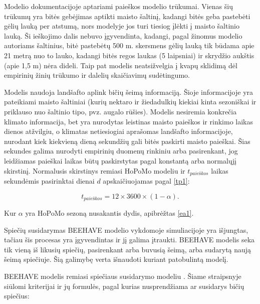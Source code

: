 \documentclass{VUMIFPSmagistrinis}
\begin{document}
Modelio dokumentacijoje aptariami paieškos modelio trūkumai. Vienas šių trūkumų yra bitės gebėjimas aptikti maisto šaltinį, kadangi bitės geba pastebėti gėlių lauką per atstumą, nors modelyje jos turi tiesiog įlėkti į maisto šaltinio lauką. Ši ieškojimo dalis nebuvo įgyvendinta, kadangi, pagal žinomus modelio autoriams šaltinius, bitė pastebėtų 500 m. skersmens gėlių lauką tik būdama apie 21 metrą nuo to lauko, kadangi bitės regos laukas (5 laipsniai) ir skrydžio aukštis (apie 1,5 m) nėra dideli. Taip pat modelis neatsižvelgia į kvapų sklidimą dėl empirinių žinių trūkumo ir dalelių skaičiavimų sudėtingumo.






Modelis naudoja landšafto aplink bičių šeimą informaciją. Šioje informacijoje yra pateikiami maisto šaltiniai (kurių nektaro ir žiedadulkių kiekiai kinta sezoniškai ir priklauso nuo šaltinio tipo, pvz. augalo rūšies).
Modelis nesiremia konkrečia klimato informacija, bet yra nurodytas leistinas maisto paieškos ir rinkimo laikas dienos atžvilgiu, o klimatas netiesiogiai aprašomas landšafto informacijoje, nurodant kiek kiekvieną dieną sekundžių gali bitės paskirti maisto paieškai. Šias sekundes galima nurodyti empirinių duomenų rinkiniu arba pasirenkant, jog leidžiamas paieškai laikas būtų paskirstytas pagal konstantą arba normalųjį skirstinį. Normalusis skirstinys remiasi HoPoMo modeliu ir $t_{paie\textit{\v{s}}kos}$ laikas sekundėmis pasirinktai dienai $d$ apskaičiuojamas pagal \eqref{tp1}:
\newpage

\begin{equation}\label{tp1}
t_{paie\textit{\v{s}}kos}= 12×3600×(1-\alpha).
\end{equation}

Kur $\alpha$ yra HoPoMo sezoną nusakantis dydis, apibrėžtas \eqref{ea1}.



Spiečių susidarymas BEEHAVE modelio vykdomoje simuliacijoje yra išjungtas, tačiau šis procesas yra įgyvendintas ir jį galima įtraukti. BEEHAVE modelis seka tik vieną iš likusių spiečių, pasirenkant arba buvusią šeimą, arba sudarytą naują šeimą spiečiuje. Šią galimybę verta išnaudoti kuriant patobulintą modelį.

BEEHAVE modelis remiasi spiečiaus susidarymo modeliu \cite{FeS06}. Šiame straipsnyje siūlomi kriterijai ir jų formulės, pagal kurias nusprendžiama ar susidarys bičių spiečius:
\end{document}
